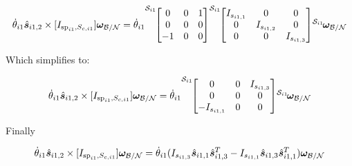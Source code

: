 \documentclass[paper]{aiaaNew}
\begin{document}
\begin{equation}
\dot{\theta}_{i1} \hat{\bm s}_{i1,2} \times [I_{\text{sp}_{i1},S_{c,i1}}]\bm \omega_{\cal{B/N}} = \dot{\theta}_{i1} {\vphantom{\begin{bmatrix}
		0 & 0 & 1 \\
		0 & 0 & 0 \\
		-1 & 0 & 0
		\end{bmatrix}}}^{\mathcal{S}_{i1}\!}{\begin{bmatrix}
	0 & 0 & 1 \\
	0 & 0 & 0 \\
	-1 & 0 & 0
	\end{bmatrix}} {\vphantom{\begin{bmatrix}
		I_{s_{i1,1}} & 0 & 0 \\
		0 & I_{s_{i1,2}} & 0 \\
		0 & 0 & I_{s_{i1,3}}
		\end{bmatrix}}}^{\mathcal{S}_{i1}\!}{\begin{bmatrix}
	I_{s_{i1,1}} & 0 & 0 \\
	0 & I_{s_{i1,2}} & 0 \\
	0 & 0 & I_{s_{i1,3}}
	\end{bmatrix}} {\vphantom{\bm \omega_{\cal{B/N}}}}^{\mathcal{S}_{i1}\!}{\bm \omega_{\cal{B/N}}}  
\end{equation}

Which simplifies to:

\begin{equation}
\dot{\theta}_{i1} \hat{\bm s}_{i1,2} \times [I_{\text{sp}_{i1},S_{c,i1}}]\bm \omega_{\cal{B/N}} = \dot{\theta}_{i1} {\vphantom{\begin{bmatrix}
		0 & 0 & I_{s_{i1,3}} \\
		0 & 0 & 0 \\
		-I_{s_{i1,1}} & 0 & 0
		\end{bmatrix}}}^{\mathcal{S}_{i1}\!}{\begin{bmatrix}
	0 & 0 & I_{s_{i1,3}} \\
	0 & 0 & 0 \\
	-I_{s_{i1,1}} & 0 & 0
	\end{bmatrix}} {\vphantom{\bm \omega_{\cal{B/N}}}}^{\mathcal{S}_{i1}\!}{\bm \omega_{\cal{B/N}}}  
\end{equation}

Finally

\begin{equation}
\dot{\theta}_{i1} \hat{\bm s}_{i1,2} \times [I_{\text{sp}_{i1},S_{c,i1}}]\bm \omega_{\cal{B/N}} = \dot{\theta}_{i1} (I_{s_{i1,3}} \hat{\bm s}_{i1,1} \hat{\bm s}_{i1,3}^T - I_{s_{i1,1}} \hat{\bm s}_{i1,3} \hat{\bm s}_{i1,1}^T) \bm \omega_{\cal{B/N}}
\end{equation}
\end{document}
